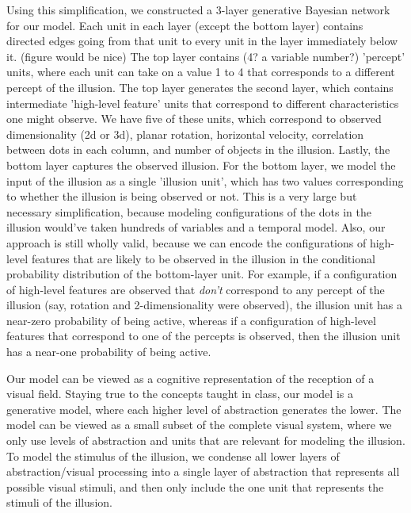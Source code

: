 \documentclass{article} %
\begin{document}
Using this simplification, we constructed a 3-layer generative Bayesian network for our model. Each unit in each layer (except the bottom layer) contains directed edges going from that unit to every unit in the layer immediately below it. (figure would be nice) The top layer contains (4? a variable number?) 'percept' units, where each unit can take on a value 1 to 4 that corresponds to a different percept of the illusion. The top layer generates the second layer, which contains intermediate 'high-level feature' units that correspond to different characteristics one might observe. We have five of these units, which correspond to observed dimensionality (2d or 3d), planar rotation, horizontal velocity, correlation between dots in each column, and number of objects in the illusion. Lastly, the bottom layer captures the observed illusion. For the bottom layer, we model the input of the illusion as a single 'illusion unit', which has two values corresponding to whether the illusion is being observed or not. This is a very large but necessary simplification, because modeling configurations of the dots in the illusion would've taken hundreds of variables and a temporal model. Also, our approach is still wholly valid, because we can encode the configurations of high-level features that are likely to be observed in the illusion in the conditional probability distribution of the bottom-layer unit. For example, if a configuration of high-level features are observed that \emph{don't} correspond to any percept of the illusion (say, rotation and 2-dimensionality were observed), the illusion unit has a near-zero probability of being active, whereas if a configuration of high-level features that correspond to one of the percepts is observed, then the illusion unit has a near-one probability of being active.

Our model can be viewed as a cognitive representation of the reception of a visual field. Staying true to the concepts taught in class, our model is a generative model, where each higher level of abstraction generates the lower. The model can be viewed as a small subset of the complete visual system, where we only use levels of abstraction and units that are relevant for modeling the illusion. To model the stimulus of the illusion, we condense all lower layers of abstraction/visual processing into a single layer of abstraction that represents all possible visual stimuli, and then only include the one unit that represents the stimuli of the illusion. 
\end{document}
